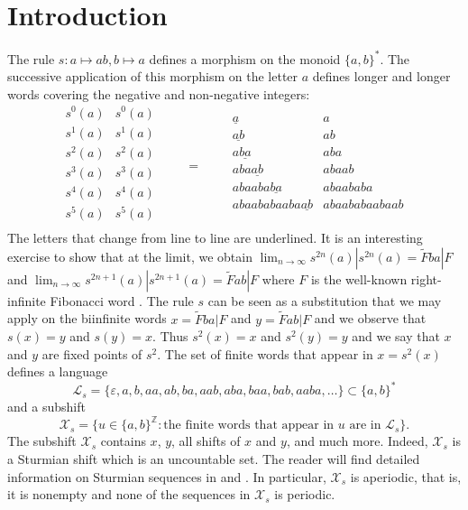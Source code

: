 \documentclass[12pt]{amsart}
\newcommand{\Z}{\mathbb{Z}}
\newcommand{\Lcal}{\mathcal{L}}
\newcommand{\Xcal}{\mathcal{X}} %
\begin{document}



\newpage
\section{Introduction}\label{chap:Labbe:sec:Introduction}

The rule
$s:a\mapsto ab, b\mapsto a$
defines a morphism on the monoid $\{a,b\}^*$.
The successive application of this morphism on the letter $a$
defines longer and longer words covering the negative and non-negative
integers:
\[
\begin{array}{r|l}
    s^0(a)&s^0(a)\\
    s^1(a)&s^1(a)\\
    s^2(a)&s^2(a)\\
    s^3(a)&s^3(a)\\
    s^4(a)&s^4(a)\\
    s^5(a)&s^5(a)\\
\end{array}
\qquad
=
\qquad
\begin{array}{r|l}
    \underline{a}& 
    a\\
    \underline{ab}& 
    ab\\
    a\underline{ba}& 
    aba\\
    aba\underline{ab}& 
    abaab\\
    abaaba\underline{ba}& 
    abaababa\\
    abaababaaba\underline{ab}& 
    abaababaabaab\\
\end{array}
\]
The letters that change from line to line are underlined.
It is an interesting exercise to show that at the limit, we obtain
$\lim_{n\to\infty}s^{2n}(a)|s^{2n}(a)= \widetilde{F}ba|F$
and
$\lim_{n\to\infty}s^{2n+1}(a)|s^{2n+1}(a)= \widetilde{F}ab|F$
where $F$ is the well-known right-infinite Fibonacci word \cite{berstel_mots_1980}.
The rule $s$ can be seen as a substitution that we may apply on the biinfinite words
$x=\widetilde{F}ba|F$
and $y=\widetilde{F}ab|F$ and we observe that
$s(x)=y$ and $s(y)=x$.
Thus $s^2(x)=x$ and $s^2(y)=y$ and we say that
$x$ and $y$ are fixed points of $s^2$.
The set of finite words that appear in $x=s^2(x)$ defines a language
\[
    \Lcal_s = \{\varepsilon, a, b, aa, ab, ba, aab, aba, baa, bab, aaba, \dots\}\subset\{a,b\}^*
\]
and a subshift
\[
    \Xcal_s = \{u\in\{a,b\}^\Z\colon\text{the finite words that appear in }u\text{ are in }\Lcal_s\}.
\]
The subshift $\Xcal_s$ contains $x$, $y$, all shifts of $x$ and $y$, and much more.
Indeed, $\Xcal_s$ is a Sturmian shift which is an uncountable set.
The reader will find detailed information on Sturmian sequences in
\cite[Chapter 2]{MR1905123} and \cite[Chapter 6]{MR1970385}.
In particular, $\Xcal_s$ is aperiodic, that is, it is nonempty and none of the
sequences in $\Xcal_s$ is periodic.
\end{document}

